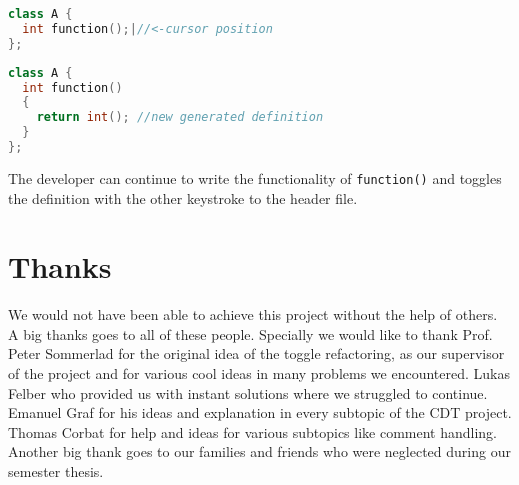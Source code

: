 \begin{lstlisting}[caption={Situation before quick implement},
label={beforeimpl}, language=C++]
class A {
  int function();|//<-cursor position
};
\end{lstlisting}

\begin{lstlisting}[caption={Situation after quick implement},
label={beforeimpl}, language=C++]
class A {
  int function()
  {
    return int(); //new generated definition
  }
};
\end{lstlisting}

The developer can continue to write the functionality of \texttt{function()}
and toggles the definition with the other keystroke to the header file.

\thispagestyle{empty}
\pagebreak

\chapter*{Thanks}
We would not have been able to achieve this project without the help of others.
A big thanks goes to all of these people.\newline
Specially we would like to thank Prof. Peter Sommerlad for the original idea
of the toggle refactoring, as our supervisor of the project and for various cool
ideas in many problems we encountered. Lukas Felber who provided us with
instant solutions where we struggled to continue. Emanuel Graf for his ideas and
explanation in every subtopic of the CDT project. Thomas Corbat for help and
ideas for various subtopics like comment handling. \newline
Another big thank goes to our families and friends who were neglected during our
semester thesis.
\thispagestyle{empty}


